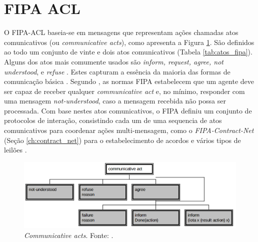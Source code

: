 \section{FIPA ACL}\label{subsubsec:fipa_acl}


O FIPA-ACL baseia-se em mensagens que representam ações chamadas atos comunicativos (ou \textit{communicative acts}), como apresenta a Figura \ref{fig:communicative_acts}. São definidos ao todo um conjunto de vinte e dois atos comunicativos (Tabela \ref{tab:atos_fipa}). Alguns dos atos mais comumente usados são \textit{inform, request, agree, not understood}, e \textit{refuse} . Estes capturam a essência da maioria das formas de comunicação básica \cite[pág. 13]{developing}. Segundo , as normas FIPA estabelecem que um agente deve ser capaz de receber qualquer \textit{communicative act}   e, no mínimo, responder com uma mensagem \textit{not-understood}, caso a mensagem recebida não possa ser processada. Com base nestes atos comunicativos, o FIPA definiu um conjunto de protocolos de interação, consistindo cada um de uma sequencia de atos comunicativos para coordenar ações multi-mensagem, como o \textit{FIPA-Contract-Net} (Seção \ref{ch:contract_net}) para o estabelecimento de acordos e vários tipos de leilões \cite[pág 14]{developing}.

\begin{figure}[h!]
    \centering
    \includegraphics[scale=0.4]{figuras/communicative_acts.png}
    \caption{\textit{Communicative acts}. Fonte: .}
    \label{fig:communicative_acts}
\end{figure}

